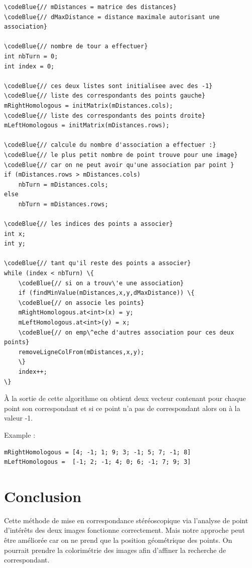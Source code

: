 \documentclass[a4paper,10pt]{article}
\begin{document}
\begin{Verbatim}[commandchars=\\\{\}]
\codeBlue{// mDistances = matrice des distances}
\codeBlue{// dMaxDistance = distance maximale autorisant une association}

\codeBlue{// nombre de tour a effectuer}
int nbTurn = 0;
int index = 0;

\codeBlue{// ces deux listes sont initialisee avec des -1}
\codeBlue{// liste des correspondants des points gauche}
mRightHomologous = initMatrix(mDistances.cols);
\codeBlue{// liste des correspondants des points droite}
mLeftHomologous = initMatrix(mDistances.rows);

\codeBlue{// calcule du nombre d'association a effectuer :}
\codeBlue{// le plus petit nombre de point trouve pour une image}
\codeBlue{// car on ne peut avoir qu'une association par point }
if (mDistances.rows > mDistances.cols)  
	nbTurn = mDistances.cols;
else                                    
	nbTurn = mDistances.rows;

\codeBlue{// les indices des points a associer}
int x;
int y;

\codeBlue{// tant qu'il reste des points a associer}
while (index < nbTurn) \{
	\codeBlue{// si on a trouv\'e une association}
	if (findMinValue(mDistances,x,y,dMaxDistance)) \{
	\codeBlue{// on associe les points}
	mRightHomologous.at<int>(x) = y;
	mLeftHomologous.at<int>(y) = x;
	\codeBlue{// on emp\^eche d'autres association pour ces deux points}
	removeLigneColFrom(mDistances,x,y);
	\}
	index++;
\}
\end{Verbatim}

\`A la sortie de cette algorithme on obtient deux vecteur contenant pour chaque point son correspondant et si ce point n'a pas de correspondant alors on \`a la valeur -1.

\newpage

Example :

\begin{Verbatim}[commandchars=\\\{\}]
mRightHomologous = [4; -1; 1; 9; 3; -1; 5; 7; -1; 8]
mLeftHomologous =  [-1; 2; -1; 4; 0; 6; -1; 7; 9; 3]
\end{Verbatim}

\section*{Conclusion}

Cette m\'ethode de mise en correspondance st\'er\'eoscopique via l'analyse de point d'int\'er\^ets des deux images fonctionne correctement. Mais notre approche peut \^etre am\'elior\'ee car on ne prend que la position g\'eom\'etrique des points. On pourrait prendre la colorim\'etrie des images afin d'affiner la recherche de correspondant.
\end{document}
